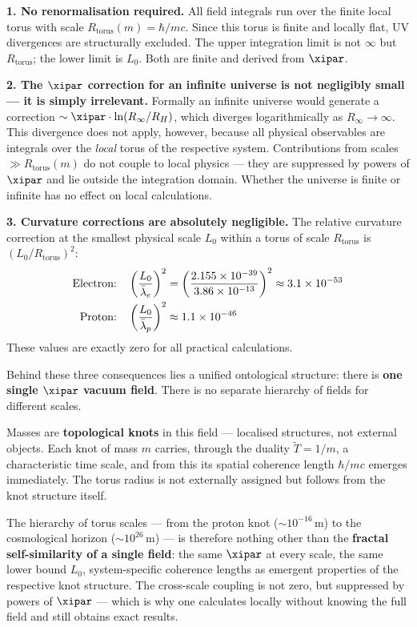 \textbf{1. No renormalisation required.} All field integrals run over the finite local torus with scale $R_\text{torus}(m) = \hbar/mc$. Since this torus is finite and locally flat, UV divergences are structurally excluded. The upper integration limit is not $\infty$ but $R_\text{torus}$; the lower limit is $L_0$. Both are finite and derived from $\xipar$.

\textbf{2. The $\xipar$ correction for an infinite universe is not negligibly small — it is simply irrelevant.} Formally an infinite universe would generate a correction $\sim \xipar \cdot \ln(R_\infty / R_H)$, which diverges logarithmically as $R_\infty \to \infty$. This divergence does not apply, however, because all physical observables are integrals over the \emph{local} torus of the respective system. Contributions from scales $\gg R_\text{torus}(m)$ do not couple to local physics — they are suppressed by powers of $\xipar$ and lie outside the integration domain. Whether the universe is finite or infinite has no effect on local calculations.

\textbf{3. Curvature corrections are absolutely negligible.} The relative curvature correction at the smallest physical scale $L_0$ within a torus of scale $R_\text{torus}$ is $(L_0 / R_\text{torus})^2$:
\begin{align}
	\text{Electron:} \quad & \left(\frac{L_0}{\bar\lambda_e}\right)^2 = \left(\frac{2{.}155\times 10^{-39}}{3{.}86\times 10^{-13}}\right)^2 \approx 3{.}1 \times 10^{-53} \notag \\
	\text{Proton:} \quad & \left(\frac{L_0}{\bar\lambda_p}\right)^2 \approx 1{.}1 \times 10^{-46} \notag
\end{align}
These values are exactly zero for all practical calculations.

\begin{keypoint}
Behind these three consequences lies a unified ontological structure: there is \textbf{one single $\xipar$ vacuum field}. There is no separate hierarchy of fields for different scales.

Masses are \textbf{topological knots} in this field — localised structures, not external objects. Each knot of mass $m$ carries, through the duality $\tilde{T} = 1/m$, a characteristic time scale, and from this its spatial coherence length $\hbar/mc$ emerges immediately. The torus radius is not externally assigned but follows from the knot structure itself.

The hierarchy of torus scales — from the proton knot ($\sim 10^{-16}$\,m) to the cosmological horizon ($\sim 10^{26}$\,m) — is therefore nothing other than the \textbf{fractal self-similarity of a single field}: the same $\xipar$ at every scale, the same lower bound $L_0$, system-specific coherence lengths as emergent properties of the respective knot structure. The cross-scale coupling is not zero, but suppressed by powers of $\xipar$ — which is why one calculates locally without knowing the full field and still obtains exact results.
\end{keypoint}

